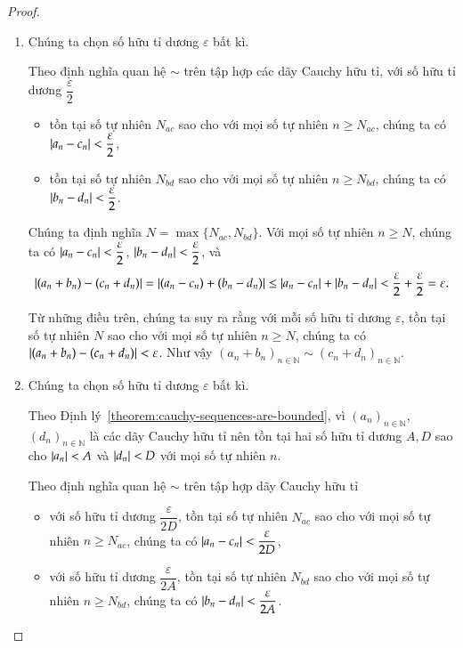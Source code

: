 \begin{proof}
    \begin{enumerate}[label={(\roman*)}]
        \item Chúng ta chọn số hữu tỉ dương $\varepsilon$ bất kì.

              Theo định nghĩa quan hệ $\sim$ trên tập hợp các dãy Cauchy hữu tỉ, với số hữu tỉ dương $\dfrac{\varepsilon}{2}$
              \begin{itemize}[topsep=0pt]
                  \item tồn tại số tự nhiên $N_{ac}$ sao cho với mọi số tự nhiên $n\geq N_{ac}$, chúng ta có $\left\vert{a_{n} - c_{n}}\right\vert < \dfrac{\varepsilon}{2}$,
                  \item tồn tại số tự nhiên $N_{bd}$ sao cho với mọi số tự nhiên $n\geq N_{bd}$, chúng ta có $\left\vert{b_{n} - d_{n}}\right\vert < \dfrac{\varepsilon}{2}$.
              \end{itemize}

              Chúng ta định nghĩa $N = \max\{ N_{ac}, N_{bd} \}$. Với mọi số tự nhiên $n\geq N$, chúng ta có $\left\vert{a_{n} - c_{n}}\right\vert < \dfrac{\varepsilon}{2}$, $\left\vert{b_{n} - d_{n}}\right\vert < \dfrac{\varepsilon}{2}$, và
              \[
                  \left\vert{(a_{n} + b_{n}) - (c_{n} + d_{n})}\right\vert = \left\vert{(a_{n} - c_{n}) + (b_{n} - d_{n})}\right\vert \leq \left\vert{a_{n} - c_{n}}\right\vert + \left\vert{b_{n} - d_{n}}\right\vert < \frac{\varepsilon}{2} + \frac{\varepsilon}{2} = \varepsilon.
              \]

              Từ những điều trên, chúng ta suy ra rằng với mỗi số hữu tỉ dương $\varepsilon$, tồn tại số tự nhiên $N$ sao cho với mọi số tự nhiên $n\geq N$, chúng ta có $\left\vert{(a_{n} + b_{n}) - (c_{n} + d_{n})}\right\vert < \varepsilon$. Như vậy ${(a_{n} + b_{n})}_{n\in\mathbb{N}} \sim {(c_{n} + d_{n})}_{n\in\mathbb{N}}$.
        \item Chúng ta chọn số hữu tỉ dương $\varepsilon$ bất kì.

              Theo Định lý~\ref{theorem:cauchy-sequences-are-bounded}, vì ${(a_{n})}_{n\in\mathbb{N}}$, ${(d_{n})}_{n\in\mathbb{N}}$ là các dãy Cauchy hữu tỉ nên tồn tại hai số hữu tỉ dương $A, D$ sao cho $\left\vert{a_{n}}\right\vert < A$ và $\left\vert{d_{n}}\right\vert < D$ với mọi số tự nhiên $n$.

              Theo định nghĩa quan hệ $\sim$ trên tập hợp dãy Cauchy hữu tỉ
              \begin{itemize}
                  \item với số hữu tỉ dương $\dfrac{\varepsilon}{2D}$, tồn tại số tự nhiên $N_{ac}$ sao cho với mọi số tự nhiên $n\geq N_{ac}$, chúng ta có $\left\vert{a_{n} - c_{n}}\right\vert < \dfrac{\varepsilon}{2D}$,
                  \item với số hữu tỉ dương $\dfrac{\varepsilon}{2A}$, tồn tại số tự nhiên $N_{bd}$ sao cho với mọi số tự nhiên $n\geq N_{bd}$, chúng ta có $\left\vert{b_{n} - d_{n}}\right\vert < \dfrac{\varepsilon}{2A}$.
              \end{itemize}


\end{enumerate}
\end{proof}

